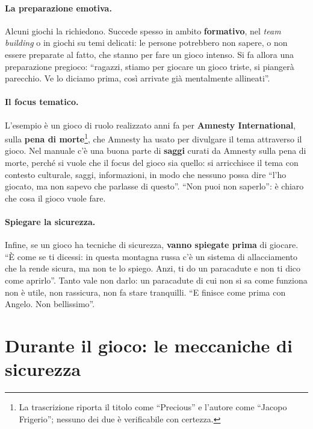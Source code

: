 \paragraph{La preparazione emotiva.} Alcuni giochi la richiedono. Succede spesso in
ambito \textbf{formativo}, nel \emph{team building} o in giochi su temi delicati: le
persone potrebbero non sapere, o non essere preparate al fatto, che stanno per fare un
gioco intenso. Si fa allora una preparazione pregioco: ``ragazzi, stiamo per giocare
un gioco triste, si piangerà parecchio. Ve lo diciamo prima, così arrivate già
mentalmente allineati''.

\paragraph{Il focus tematico.} L'esempio è un gioco di ruolo realizzato anni fa per
\textbf{Amnesty International}, sulla \textbf{pena di morte}\footnote{La trascrizione
riporta il titolo come ``Precious'' e l'autore come ``Jacopo Frigerio''; nessuno dei
due è verificabile con certezza.}, che Amnesty ha usato per divulgare il tema
attraverso il gioco. Nel manuale c'è una buona parte di \textbf{saggi} curati da
Amnesty sulla pena di morte, perché si vuole che il focus del gioco sia quello:
si arricchisce il tema con contesto culturale, saggi, informazioni, in modo che
nessuno possa dire ``l'ho giocato, ma non sapevo che parlasse di questo''. ``Non puoi
non saperlo'': è chiaro che cosa il gioco vuole fare.

\paragraph{Spiegare la sicurezza.} Infine, se un gioco ha tecniche di sicurezza,
\textbf{vanno spiegate prima} di giocare. ``È come se ti dicessi: in questa montagna
russa c'è un sistema di allacciamento che la rende sicura, ma non te lo spiego. Anzi,
ti do un paracadute e non ti dico come aprirlo''. Tanto vale non darlo: un paracadute
di cui non si sa come funziona non è utile, non rassicura, non fa stare tranquilli.
``E finisce come prima con Angelo. Non bellissimo''.

\section{Durante il gioco: le meccaniche di sicurezza}
\label{a5:sec:durante}



